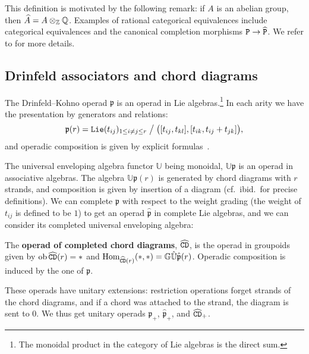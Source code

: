 This definition is motivated by the following remark: if $A$ is an abelian group, then $\widehat{A} = A \otimes_{\mathbb{Z}} \mathbb{Q}$.
Examples of rational categorical equivalences include categorical equivalences and the canonical completion morphisms $\mathtt{P} \to \widehat{\mathtt{P}}$.
We refer to \cite[§I.9]{Fresse2017} for more details.

\subsection{Drinfeld associators and chord diagrams}
\label{sw.sec.drinf-assoc-chord}

\begin{definition}
  The Drinfeld--Kohno operad $\mathfrak{p}$ is an operad in Lie algebras.\footnote{The monoidal product in the category of Lie algebras is the direct sum.}
  In each arity we have the presentation by generators and relations:
  \[ \mathfrak{p}(r) = \mathtt{Lie}(t_{ij})_{1 \leq i \neq j \leq r} \bigm/ \bigl( [t_{ij}, t_{kl}], [t_{ik}, t_{ij} + t_{jk}] \bigr), \]
  and operadic composition is given by explicit formulas~\cite[§I.10.2]{Fresse2017}.
\end{definition}

The universal enveloping algebra functor $\mathbb{U}$ being monoidal, $\mathbb{U}\mathfrak{p}$ is an operad in associative algebras.
The algebra $\mathbb{U}\mathfrak{p}(r)$ is generated by chord diagrams with $r$ strands, and composition is given by insertion of a diagram (cf.\ ibid.\ for precise definitions).
 We can complete $\mathfrak{p}$ with respect to the weight grading (the weight of $t_{ij}$ is defined to be $1$) to get an operad $\hat{\mathfrak{p}}$ in complete Lie algebras, and we can consider its completed universal enveloping algebra:

\begin{definition}
  The \textbf{operad of completed chord diagrams}, $\widehat{\mathtt{CD}}$, is the operad in group\-oids given by $\operatorname{ob} \widehat{\mathtt{CD}}(r) = *$ and $\operatorname{Hom}_{\widehat{\mathtt{CD}}(r)}(*,*) = \mathbb{G} \hat{\mathbb{U}} \hat{\mathfrak{p}}(r)$.
  Operadic composition is induced by the one of $\mathfrak{p}$.
\end{definition}

These operads have unitary extensions: restriction operations forget strands of the chord diagrams, and if a chord was attached to the strand, the diagram is sent to $0$.
We thus get unitary operads $\mathfrak{p}_{+}$, $\hat{\mathfrak{p}}_{+}$, and $\widehat{\mathtt{CD}}_{+}$.

